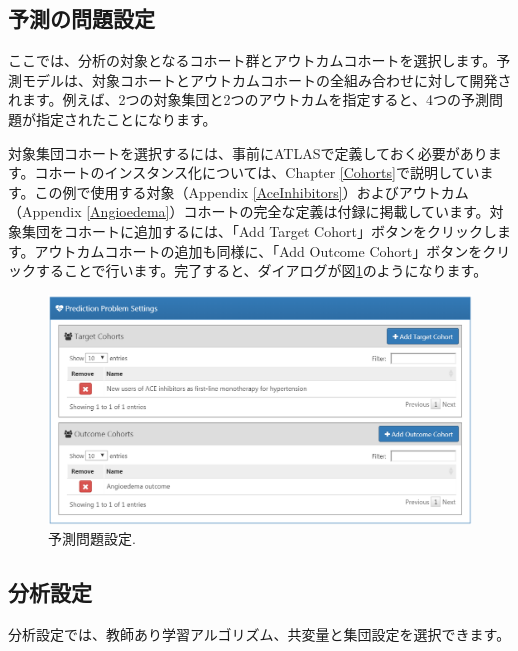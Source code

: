 \documentclass[
  11pt]{book}
\theoremstyle{definition}
\theoremstyle{definition}
\theoremstyle{definition}
\theoremstyle{definition}
\theoremstyle{remark}
\begin{document}
\subsection{予測の問題設定}\label{ux4e88ux6e2cux306eux554fux984cux8a2dux5b9a}

ここでは、分析の対象となるコホート群とアウトカムコホートを選択します。予測モデルは、対象コホートとアウトカムコホートの全組み合わせに対して開発されます。例えば、2つの対象集団と2つのアウトカムを指定すると、4つの予測問題が指定されたことになります。

対象集団コホートを選択するには、事前にATLASで定義しておく必要があります。コホートのインスタンス化については、Chapter \ref{Cohorts}で説明しています。この例で使用する対象（Appendix \ref{AceInhibitors}）およびアウトカム（Appendix \ref{Angioedema}）コホートの完全な定義は付録に掲載しています。対象集団をコホートに追加するには、「Add Target Cohort」ボタンをクリックします。アウトカムコホートの追加も同様に、「Add Outcome Cohort」ボタンをクリックすることで行います。完了すると、ダイアログが図\ref{fig:problemSettings}のようになります。

\begin{figure}

{\centering \includegraphics[width=1\linewidth]{images/PatientLevelPrediction/problemSettings} 

}

\caption{予測問題設定.}\label{fig:problemSettings}
\end{figure}

\subsection{分析設定}\label{ux5206ux6790ux8a2dux5b9a}

分析設定では、教師あり学習アルゴリズム、共変量と集団設定を選択できます。
\end{document}
